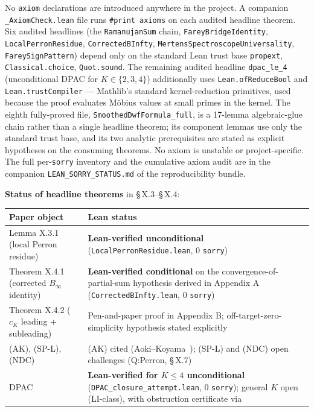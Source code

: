 No \texttt{axiom} declarations are introduced anywhere in the project. A
companion \texttt{\_AxiomCheck.lean} file runs \texttt{\#print\ axioms} on each
audited headline theorem. Six audited headlines (the \texttt{RamanujanSum}
chain, \texttt{FareyBridgeIdentity}, \texttt{LocalPerronResidue},
\texttt{CorrectedBInfty}, \texttt{MertensSpectroscopeUniversality},
\texttt{FareySignPattern}) depend only on the standard Lean trust base
\texttt{propext}, \texttt{Classical.choice}, \texttt{Quot.sound}. The remaining audited
headline \texttt{dpac\_le\_4} (unconditional DPAC for \(K \in \{2, 3, 4\}\))
additionally uses \texttt{Lean.ofReduceBool} and \texttt{Lean.trustCompiler} ---
Mathlib's standard kernel-reduction primitives, used because the
proof evaluates Möbius values at small primes in the kernel. The
eighth fully-proved file, \texttt{SmoothedDwfFormula\_full}, is a 17-lemma
algebraic-glue chain rather than a single headline theorem; its
component lemmas use only the standard trust base, and its two
analytic prerequisites are stated as explicit hypotheses on the
consuming theorems. No axiom is unstable or project-specific. The
full per-\texttt{sorry} inventory and the cumulative axiom audit are in
the companion \texttt{LEAN\_SORRY\_STATUS.md} of the reproducibility bundle.

\textbf{Status of headline theorems} in \S\,X.3--\S\,X.4:

{\def\LTcaptype{none} %
\begin{longtable}[]{@{}
  >{\raggedright\arraybackslash}p{}
  >{\raggedright\arraybackslash}p{}@{}}
\toprule\noalign{}
\begin{minipage}[b]{\linewidth}\raggedright
Paper object
\end{minipage} & \begin{minipage}[b]{\linewidth}\raggedright
Lean status
\end{minipage} \\
\midrule\noalign{}
\endhead
\bottomrule\noalign{}
\endlastfoot
Lemma X.3.1 (local Perron residue) & \textbf{Lean-verified unconditional} (\texttt{LocalPerronResidue.lean}, 0 \texttt{sorry}) \\
Theorem X.4.1 (corrected \(B_\infty\) identity) & \textbf{Lean-verified conditional} on the convergence-of-partial-sum hypothesis derived in Appendix A (\texttt{CorrectedBInfty.lean}, 0 \texttt{sorry}) \\
Theorem X.4.2 (\(c_K\) leading + subleading) & Pen-and-paper proof in Appendix B; off-target-zero-simplicity hypothesis stated explicitly \\
(AK), (SP-L), (NDC) & (AK) cited (Aoki--Koyama~\cite{AokiKoyama2023}); (SP-L) and (NDC) open challenges (Q:Perron, \S\,X.7) \\
DPAC & \textbf{Lean-verified for \(K \le 4\) unconditional} (\texttt{DPAC\_closure\_attempt.lean}, 0 \texttt{sorry}); general \(K\) open (LI-class), with obstruction certificate via \cite{Polya1913} \\
\end{longtable}
}

